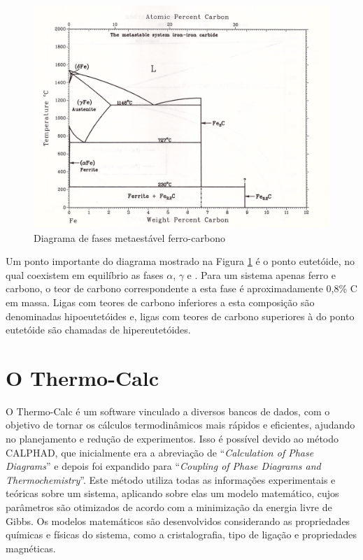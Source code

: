 \documentclass[brazil,tf,epusp]{usp}  %
\begin{document}
\begin{figure}[ht!]
  \includegraphics[width=.8\textwidth,angle=180]{img/Fe-C_meta.jpg}
  \caption{Diagrama de fases metaestável ferro-carbono \cite{Massalski1996v1}}
  \label{fig:diagrama_fe-c_meta}
\end{figure}

Um ponto importante do diagrama mostrado na Figura \ref{fig:diagrama_fe-c_meta} é o ponto eutetóide, no qual coexistem em equilíbrio as fases $\alpha$, $\gamma$ e . Para um sistema apenas ferro e carbono, o teor de carbono correspondente a esta fase é aproximadamente 0,8\% C em massa. Ligas com teores de carbono inferiores a esta composição são denominadas hipoeutetóides e, ligas com teores de carbono superiores à do ponto eutetóide são chamadas de hipereutetóides.

\section{O Thermo-Calc\textregistered{}}

O Thermo-Calc\textregistered{} é um software vinculado a diversos bancos de dados, com o objetivo de tornar os cálculos termodinâmicos mais rápidos e eficientes, ajudando no planejamento e redução de experimentos. Isso é possível devido ao método CALPHAD, que inicialmente era a abreviação de ``\textit{Calculation of Phase Diagrams}'' e depois foi expandido para ``\textit{Coupling of Phase Diagrams and Thermochemistry}''. Este método utiliza todas as informações experimentais e teóricas sobre um sistema, aplicando sobre elas um modelo matemático, cujos parâmetros são otimizados de acordo com a minimização da energia livre de Gibbs. Os modelos matemáticos são desenvolvidos considerando as propriedades químicas e físicas do sistema, como a cristalografia, tipo de ligação e propriedades magnéticas.
\end{document}
